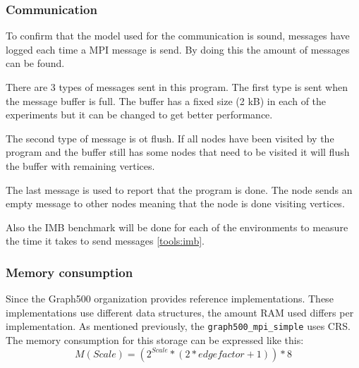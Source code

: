 \subsubsection{Communication}
\label{med:comm}
To confirm that the model used for the communication is sound, messages have logged each time a MPI message is send. By doing this the amount of messages can be found.

There are 3 types of messages sent in this program. The first type is sent when the message buffer is full. The buffer has a fixed size (2 kB) in each of the experiments but it can be changed to get better performance. 

The second type of message is ot flush. If all nodes have been visited by the program and the buffer still has some nodes that need to be visited it will flush the buffer with remaining vertices.

The last message is used to report that the program is done. The node sends an empty message to other nodes meaning that the node is done visiting vertices.

Also the IMB benchmark will be done for each of the environments to measure the time it takes to send messages \ref{tools:imb}.

\subsubsection{Memory consumption}
Since the Graph500 organization provides reference implementations. These implementations use different data structures, the amount RAM used differs per implementation. As mentioned previously, the \texttt{graph500\_mpi\_simple} uses CRS. The memory consumption for this storage can be expressed like this:
\begin{equation}
M(Scale) = (2^{Scale} *(2*edgefactor + 1)) * 8
\end{equation}

